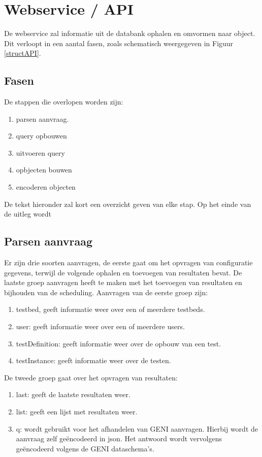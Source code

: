 \section{Webservice / API}
\npar
De webservice zal informatie uit de databank ophalen en omvormen naar object. Dit verloopt in een aantal fasen, zoals schematisch weergegeven in Figuur \ref{structAPI}.
\clearpage
\subsection{Fasen}
\npar
De stappen die overlopen worden zijn:
\begin{enumerate}
\item parsen aanvraag.
\item query opbouwen
\item uitvoeren query
\item opbjecten bouwen
\item encoderen objecten
\end{enumerate}
De tekst hieronder zal kort een overzicht geven van elke stap. Op het einde van de uitleg wordt 
\subsection{Parsen aanvraag}
\npar
Er zijn drie soorten aanvragen, de eerste gaat om het opvragen van configuratie gegevens, terwijl de volgende ophalen en toevoegen van resultaten bevat. De laatste groep aanvragen heeft te maken met het toevoegen van resultaten en bijhouden van de scheduling.
\npar
Aanvragen van de eerste groep zijn:
\begin{enumerate}
\item testbed, geeft informatie weer over een of meerdere testbeds.
\item user: geeft informatie weer over een of meerdere users.
\item testDefinition: geeft informatie weer over de opbouw van een test.
\item testInstance: geeft informatie weer over de testen.
\end{enumerate}
De tweede groep gaat over het opvragen van resultaten:
\begin{enumerate}
\item last: geeft de laatste resultaten weer.
\item list: geeft een lijst met resultaten weer.
\item q: wordt gebruikt voor het afhandelen van GENI aanvragen. Hierbij wordt de aanvraag zelf ge\"encodeerd in json. Het antwoord wordt vervolgens ge\"encodeerd volgens de GENI dataschema's.
\end{enumerate}

